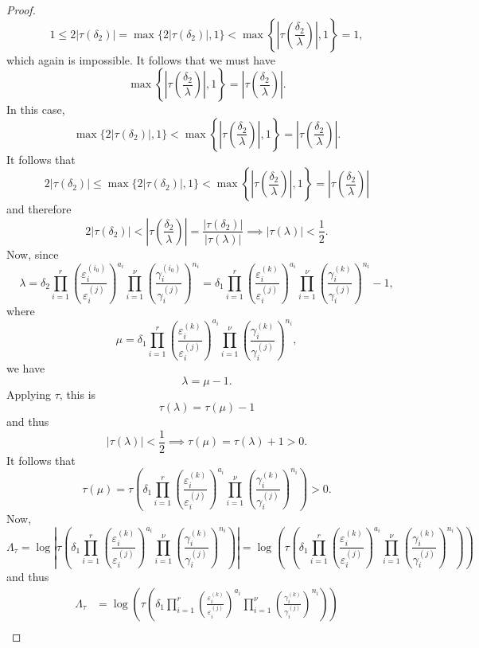 \begin{proof}
\[1 \leq 2|\tau(\delta_2)| = \max\{2|\tau(\delta_2)|,1\} < \max \left\{ \left|\tau\left(\frac{\delta_2}{\lambda}\right)\right|, 1\right\} = 1,\]
which again is impossible. It follows that we must have
\[\max \left\{ \left|\tau\left(\frac{\delta_2}{\lambda}\right)\right|, 1\right\} = \left|\tau\left(\frac{\delta_2}{\lambda}\right)\right|.\]
In this case, 
\[\max\{2|\tau(\delta_2)|,1\} < \max \left\{ \left|\tau\left(\frac{\delta_2}{\lambda}\right)\right|, 1\right\} = \left|\tau\left(\frac{\delta_2}{\lambda}\right)\right|.\]
It follows that
\[2|\tau(\delta_2)| \leq \max\{2|\tau(\delta_2)|,1\} < \max \left\{ \left|\tau\left(\frac{\delta_2}{\lambda}\right)\right|, 1\right\} = \left|\tau\left(\frac{\delta_2}{\lambda}\right)\right|\]
and therefore
\[2|\tau(\delta_2)| < \left|\tau\left(\frac{\delta_2}{\lambda}\right)\right| = \frac{|\tau(\delta_2)|}{|\tau(\lambda)|} \implies |\tau(\lambda)| < \frac{1}{2}.\]
Now, since
\[\lambda = \delta_2 \prod_{i = 1}^{r}\left( \frac{\varepsilon_i^{(i_0)}}{\varepsilon_i^{(j)}}\right)^{a_i} \prod_{i = 1}^{\nu} \left( \frac{\gamma_i^{(i_0)}}{\gamma_i^{(j)}}\right)^{n_i} = \delta_1 \prod_{i = 1}^r\left( \frac{\varepsilon_i^{(k)}}{\varepsilon_i^{(j)}}\right)^{a_i}\prod_{i = 1}^{\nu} \left( \frac{\gamma_i^{(k)}}{\gamma_i^{(j)}}\right)^{n_i} - 1,\]
where
\[\mu =  \delta_1 \prod_{i = 1}^r\left( \frac{\varepsilon_i^{(k)}}{\varepsilon_i^{(j)}}\right)^{a_i}\prod_{i = 1}^{\nu} \left( \frac{\gamma_i^{(k)}}{\gamma_i^{(j)}}\right)^{n_i},\]
we have
\[\lambda = \mu - 1.\]
Applying $\tau$, this is
\[\tau(\lambda) = \tau(\mu) -1\]
and thus
\[|\tau(\lambda)| < \frac{1}{2} \implies \tau(\mu) = \tau(\lambda) + 1 > 0.\]
It follows that
\[\tau(\mu) = \tau\left(\delta_1 \prod_{i = 1}^r\left( \frac{\varepsilon_i^{(k)}}{\varepsilon_i^{(j)}}\right)^{a_i}\prod_{i = 1}^{\nu} \left( \frac{\gamma_i^{(k)}}{\gamma_i^{(j)}}\right)^{n_i}\right) > 0.\]
Now, 
\[\Lambda_{\tau} = \log\left|\tau\left(\delta_1 \prod_{i = 1}^r\left( \frac{\varepsilon_i^{(k)}}{\varepsilon_i^{(j)}}\right)^{a_i}\prod_{i = 1}^{\nu} \left( \frac{\gamma_i^{(k)}}{\gamma_i^{(j)}}\right)^{n_i}\right)\right|= \log\left(\tau\left(\delta_1 \prod_{i = 1}^r\left( \frac{\varepsilon_i^{(k)}}{\varepsilon_i^{(j)}}\right)^{a_i}\prod_{i = 1}^{\nu} \left( \frac{\gamma_i^{(k)}}{\gamma_i^{(j)}}\right)^{n_i}\right)\right) \]
and thus
\begin{align*}
\Lambda_{\tau}	
	& = \log\left(\tau\left(\delta_1 \prod_{i = 1}^r\left( \frac{\varepsilon_i^{(k)}}{\varepsilon_i^{(j)}}\right)^{a_i}\prod_{i = 1}^{\nu} \left( \frac{\gamma_i^{(k)}}{\gamma_i^{(j)}}\right)^{n_i}\right)\right)\\

\end{align*}
\end{proof}
